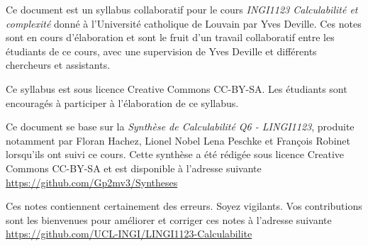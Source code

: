 
Ce document est un syllabus collaboratif pour le cours \emph{INGI1123 Calculabilité et complexité}  donné à l'Université catholique de Louvain par Yves Deville.  Ces notes sont en cours d'élaboration et sont le fruit d'un travail collaboratif entre les étudiants de ce cours, avec une supervision de Yves Deville et différents chercheurs et assistants.

Ce syllabus est sous licence Creative Commons CC-BY-SA.  Les étudiants sont encouragés à participer à l'élaboration de ce syllabus.  

Ce document se base sur la \emph{Synthèse de Calculabilité Q6 - LINGI1123}, produite notamment par Floran Hachez, Lionel Nobel Lena Peschke et François Robinet lorsqu'ils ont suivi ce cours.  Cette synthèse a été rédigée sous licence Creative Commons CC-BY-SA et est disponible à l’adresse suivante
\url{https://github.com/Gp2mv3/Syntheses}

Ces notes contiennent certainement des erreurs.  Soyez vigilants.  Vos contributions sont les bienvenues pour améliorer et corriger ces notes à l'adresse suivante
\url{https://github.com/UCL-INGI/LINGI1123-Calculabilite}



